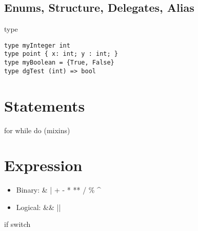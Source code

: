 \documentclass[9pt,a4paper]{article}
\begin{document}
\subsection*{Enums, Structure, Delegates, Alias}
type

\begin{lstlisting}
type myInteger int
type point { x: int; y : int; }
type myBoolean = {True, False}
type dgTest (int) => bool
\end{lstlisting}


\section{Statements}
for while do (mixins)

\section{Expression}
\begin{itemize}
\item Binary: \& | + - * ** / \% \textasciicircum{} 
\item Logical: \&\&  ||
\end{itemize}
if 
switch
\end{document}
